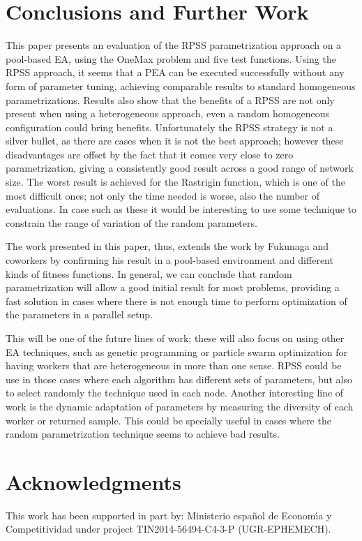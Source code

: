 \documentclass{llncs}
\begin{document}
\section{Conclusions and Further Work}
\label{sec:conclusions}
This paper presents an evaluation of the RPSS parametrization approach on 
a pool-based EA, using the OneMax problem and five test functions. 
Using the RPSS approach, it seems that a PEA can be executed successfully 
without any form of parameter tuning, achieving comparable results to standard homogeneous
parametrizations. Results also show that the benefits of a RPSS are not only present
when using a heterogeneous approach, even a random homogeneous configuration could bring
benefits. Unfortunately the RPSS strategy is not a silver bullet, as there are cases
when it is not the best approach; however these disadvantages are
offset by the fact that it comes very close to zero parametrization,
giving a consistently good result across a good range of network
size. The worst result is achieved for the Rastrigin function, which
is one of the most difficult ones; not only the time needed is worse,
also the number of evaluations. In case such as these it would be
interesting to use some technique to constrain the range of variation
of the random parameters.

The work presented in this paper, thus, extends the work by Fukunaga
and coworkers by confirming his result in a pool-based environment and
different kinds of fitness functions. In general, we can conclude that
random parametrization will allow a good initial result for most
problems, providing a fast solution in cases where there is not enough
time to perform optimization of the parameters in a parallel setup. 


This will be one of the future lines of work; these will also focus on using other EA techniques, 
such as genetic programming or particle swarm optimization for having 
workers that are heterogeneous in more than one sense. RPSS could be
use in those cases where each algorithm has different sets of
parameters, but also to select randomly the technique used in each
node. Another interesting line of work is the dynamic adaptation of
parameters by measuring the diversity of each worker or returned
sample. This could be specially useful in cases where the random
parametrization technique seems to achieve bad results. 

\section*{Acknowledgments}

This work has been supported in part by:  Ministerio espa\~{n}ol de
Econom\'{\i}a y Competitividad under project TIN2014-56494-C4-3-P
(UGR-EPHEMECH).




\end{document}
